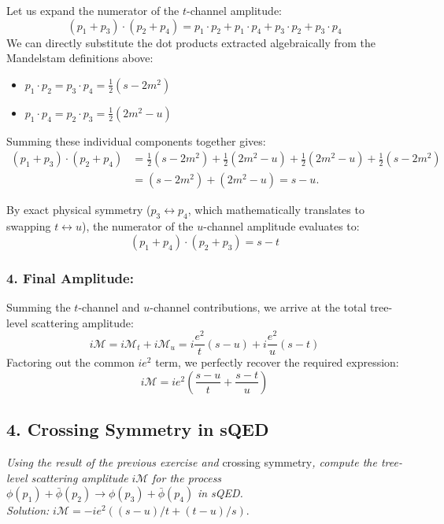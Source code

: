 Let us expand the numerator of the $t$-channel amplitude:
\[
    (p_1 + p_3) \cdot (p_2 + p_4) = p_1 \cdot p_2 + p_1 \cdot p_4 + p_3 \cdot p_2 + p_3 \cdot p_4
\]
We can directly substitute the dot products extracted algebraically from the Mandelstam definitions above:
\begin{itemize}
    \item $p_1 \cdot p_2 = p_3 \cdot p_4 = \frac{1}{2}(s - 2m^2)$
    \item $p_1 \cdot p_4 = p_2 \cdot p_3 = \frac{1}{2}(2m^2 - u)$
\end{itemize}
Summing these individual components together gives:
\[
    \begin{aligned}
        (p_1 + p_3) \cdot (p_2 + p_4) & = \frac{1}{2}(s - 2m^2) + \frac{1}{2}(2m^2 - u) + \frac{1}{2}(2m^2 - u) + \frac{1}{2}(s - 2m^2) \\
                                      & = (s - 2m^2) + (2m^2 - u) = s - u.
    \end{aligned}
\]

By exact physical symmetry ($p_3 \leftrightarrow p_4$, which mathematically translates to swapping $t \leftrightarrow u$), the numerator of the $u$-channel amplitude evaluates to:
\[
    (p_1 + p_4) \cdot (p_2 + p_3) = s - t
\]

\subsubsection*{4. Final Amplitude:}
Summing the $t$-channel and $u$-channel contributions, we arrive at the total tree-level scattering amplitude:
\[
    i\mathcal{M} = i\mathcal{M}_t + i\mathcal{M}_u = i\frac{e^2}{t}(s - u) + i\frac{e^2}{u}(s - t)
\]
Factoring out the common $ie^2$ term, we perfectly recover the required expression:
\[
    i\mathcal{M} = ie^2 \left( \frac{s - u}{t} + \frac{s - t}{u} \right)
\]


\subsection*{4. Crossing Symmetry in sQED}

\begin{center}
    \textit{Using the result of the previous exercise and } crossing symmetry\textit{, compute the tree-level scattering amplitude } $i\mathcal{M}$ \textit{ for the process } $\phi(p_1) + \bar{\phi}(p_2) \to \phi(p_3) + \bar{\phi}(p_4)$ \textit{ in sQED.} \\
    \textit{Solution: } $i\mathcal{M} = -ie^2((s-u)/t + (t-u)/s)$.
\end{center}

